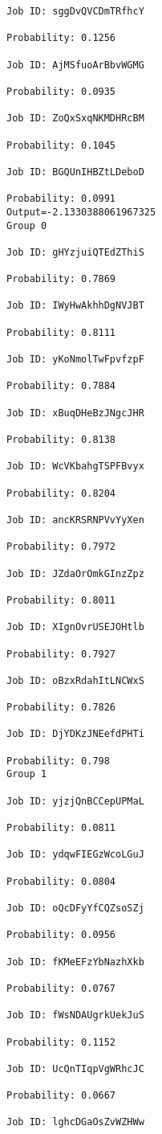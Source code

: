 \documentclass[11pt]{article}
\begin{document}
\begin{Verbatim}[commandchars=\\\{\}]
Job ID: sggDvQVCDmTRfhcY

Probability: 0.1256

Job ID: AjMSfuoArBbvWGMG

Probability: 0.0935

Job ID: ZoQxSxqNKMDHRcBM

Probability: 0.1045

Job ID: BGQUnIHBZtLDeboD

Probability: 0.0991
Output=-2.1330388061967325
Group 0

Job ID: gHYzjuiQTEdZThiS

Probability: 0.7869

Job ID: IWyHwAkhhDgNVJBT

Probability: 0.8111

Job ID: yKoNmolTwFpvfzpF

Probability: 0.7884

Job ID: xBuqDHeBzJNgcJHR

Probability: 0.8138

Job ID: WcVKbahgTSPFBvyx

Probability: 0.8204

Job ID: ancKRSRNPVvYyXen

Probability: 0.7972

Job ID: JZdaOrOmkGInzZpz

Probability: 0.8011

Job ID: XIgnOvrUSEJOHtlb

Probability: 0.7927

Job ID: oBzxRdahItLNCWxS

Probability: 0.7826

Job ID: DjYDKzJNEefdPHTi

Probability: 0.798
Group 1

Job ID: yjzjQnBCCepUPMaL

Probability: 0.0811

Job ID: ydqwFIEGzWcoLGuJ

Probability: 0.0804

Job ID: oQcDFyYfCQZsoSZj

Probability: 0.0956

Job ID: fKMeEFzYbNazhXkb

Probability: 0.0767

Job ID: fWsNDAUgrkUekJuS

Probability: 0.1152

Job ID: UcQnTIqpVgWRhcJC

Probability: 0.0667

Job ID: lghcDGaOsZvWZHWw


\end{Verbatim}
\end{document}
